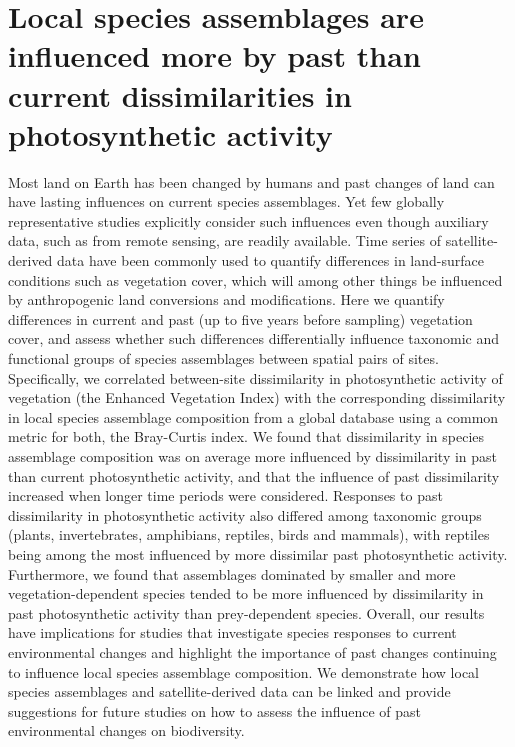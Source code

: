 \chapter{ Local species assemblages are influenced more by past than current dissimilarities in photosynthetic activity}
\label{C02}

Most land on Earth has been changed by humans and past changes of land can have lasting influences on current species assemblages. Yet few globally representative studies explicitly consider such influences even though auxiliary data, such as from remote sensing, are readily available. Time series of satellite-derived data have been commonly used to quantify differences in land-surface conditions such as vegetation cover, which will among other things be influenced by anthropogenic land conversions and modifications. Here we quantify differences in current and past (up to five years before sampling) vegetation cover, and assess whether such differences differentially influence taxonomic and functional groups of species assemblages between spatial pairs of sites. Specifically, we correlated between-site dissimilarity in photosynthetic activity of vegetation (the Enhanced Vegetation Index) with the corresponding dissimilarity in local species assemblage composition from a global database using a common metric for both, the Bray-Curtis index. We found that dissimilarity in species assemblage composition was on average more influenced by dissimilarity in past than current photosynthetic activity, and that the influence of past dissimilarity increased when longer time periods were considered. Responses to past dissimilarity in photosynthetic activity also differed among taxonomic groups (plants, invertebrates, amphibians, reptiles, birds and mammals), with reptiles being among the most influenced by more dissimilar past photosynthetic activity. Furthermore, we found that assemblages dominated by smaller and more vegetation-dependent species tended to be more influenced by dissimilarity in past photosynthetic activity than prey-dependent species. Overall, our results have implications for studies that investigate species responses to current environmental changes and highlight the importance of past changes continuing to influence local species assemblage composition. We demonstrate how local species assemblages and satellite-derived data can be linked and provide suggestions for future studies on how to assess the influence of past environmental changes on biodiversity.

